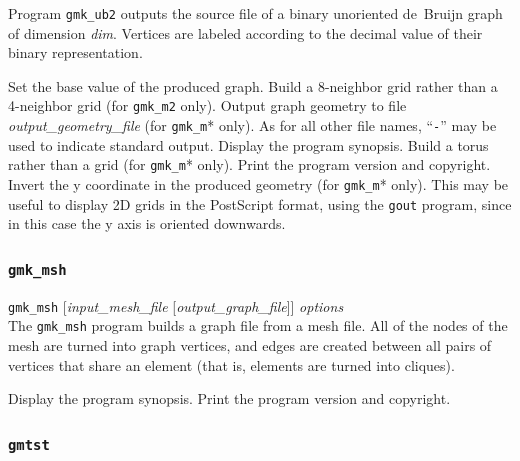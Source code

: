\begin{itemize}
\noi
Program \texttt{gmk\_ub2} outputs the source file of a binary unoriented
de~Bruijn graph of dimension {\it dim}. Vertices are labeled according to
the decimal value of their binary representation.

\progopt
\begin{itemize}
Set the base value of the produced graph.
\iteme[\texttt{-e}]
Build a 8-neighbor grid rather than a 4-neighbor grid (for \texttt{gmk\_m2} only).
Output graph geometry to file {\it output\_geometry\_file}
(for \texttt{gmk\_m}* only).
As for all other file names, ``\texttt{-}''
may be used to indicate standard output.
\iteme[\texttt{-h}]
Display the program synopsis.
\iteme[\texttt{-t}]
Build a torus rather than a grid (for \texttt{gmk\_m}* only).
\iteme[\texttt{-V}]
Print the program version and copyright.
\iteme[\texttt{-y}]
Invert the y coordinate in the produced geometry (for \texttt{gmk\_m}*
only). This may be useful to display 2D grids in the PostScript
format, using the \texttt{gout} program, since in this case the y axis
is oriented downwards.
\end{itemize}
\end{itemize}

\subsubsection{\texttt{gmk\_msh}}
\label{sec-prog-gmkmsh}

\begin{itemize}
\progsyn
\texttt{gmk\_msh} [{\it input\_mesh\_file} [{\it output\_graph\_file}]] {\it options}\\

\progdes
The \texttt{gmk\_msh} program builds a graph file from a mesh file. All
of the nodes of the mesh are turned into graph vertices, and edges
are created between all pairs of vertices that share an element (that
is, elements are turned into cliques).

\progopt
\begin{itemize}
\iteme[\texttt{-h}]
Display the program synopsis.
\iteme[\texttt{-V}]
Print the program version and copyright.
\end{itemize}
\end{itemize}

\subsubsection{\texttt{gmtst}}

